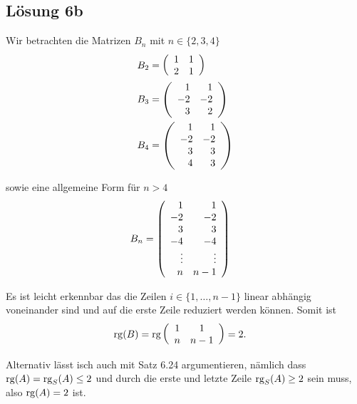 \documentclass[main.tex]{subfiles}
\begin{document}
\subsection{Lösung 6b}

Wir betrachten die Matrizen $B_n$ mit $n\in \{2, 3, 4\}$
\begin{align*}
    B_2 &= \eqmatrix{rr}{
        1 & 1 \\
        2 & 1 
    } \\
    B_3 &= \eqmatrix{rr}{
         1 &  1 \\
        -2 & -2 \\
         3 &  2
    } \\
    B_4 &= \eqmatrix{rr}{
         1 &  1 \\
        -2 & -2 \\
         3 &  3 \\
         4 &  3
    }
\end{align*}

sowie eine allgemeine Form für $n > 4$
\begin{align*}
    B_n &= \eqmatrix{rr}{
        1 &  1 \\
       -2 & -2 \\
        3 &  3 \\
       -4 & -4 \\
       \vdots & \vdots \\
       n &  n-1 
   }
\end{align*}

Es ist leicht erkennbar das die Zeilen $i \in \{1, \ldots, n-1\}$ linear abhängig voneinander sind und auf die erste Zeile reduziert werden können. 
Somit ist 
\begin{align*}
    \rg (B) &= \rg \eqmatrix{cc}{
        1 &  1 \\
        n &  n-1 
    } = 2.
\end{align*}

Alternativ lässt isch auch mit Satz 6.24 argumentieren, nämlich dass $\rg(A) = \rg_S(A) \leq 2$ und durch die erste und letzte Zeile $\rg_S(A) \geq 2$ sein muss, 
also $\rg(A) = 2$ ist.
\end{document}
